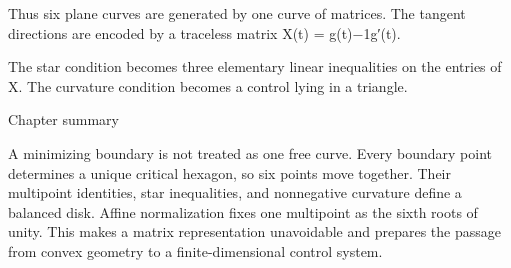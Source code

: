 Thus six plane curves are generated by one curve of matrices. The tangent directions are encoded by a traceless matrix X(t) = g(t)−1g′(t).


The star condition becomes three elementary linear inequalities on the entries of X. The curvature condition becomes a control lying in a triangle.


\begin{insightbox}{Chapter summary}
\end{insightbox}

A minimizing boundary is not treated as one free curve. Every boundary point determines a unique critical hexagon, so six points move together. Their multipoint identities, star inequalities, and nonnegative curvature define a balanced disk. Affine normalization fixes one multipoint as the sixth roots of unity. This makes a matrix representation unavoidable and prepares the passage from convex geometry to a finite-dimensional control system.

